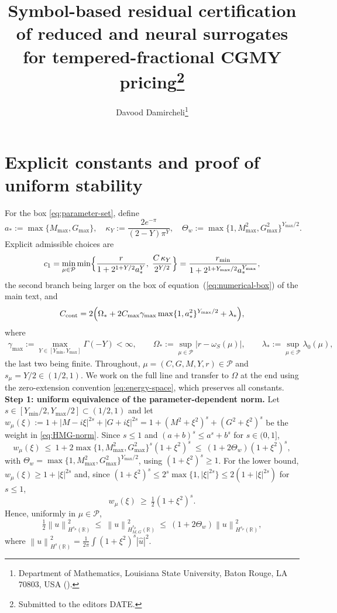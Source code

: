 \documentclass[supplement,hidelinks]{siamart251216}
\title{Symbol-based residual certification of reduced and neural surrogates for tempered-fractional CGMY pricing\thanks{Submitted to the editors DATE.}}
\author{Davood Damircheli\thanks{Department of Mathematics, Louisiana State University, Baton Rouge, LA 70803, USA
(\email{ddamircheli@lsu.edu}).}}
\newcommand{\R}{\mathbb{R}}
\newcommand{\Pset}{\mathcal{P}}
\newcommand{\norm}[1]{\left\lVert #1\right\rVert}
\newcommand{\rf}{r}
\begin{document}
\maketitle
\section{Explicit constants and proof of uniform stability}
\label{app:proof-uniform}\label{ssec:lk-coercivity}
For the box \eqref{eq:parameter-set}, define
\begin{equation}
  a_\ast:=\max\{M_{\max},G_{\max}\},\quad
  \kappa_Y:=\frac{2e^{-\pi}}{(2-Y)\pi^{Y}},\quad
  \Theta_w:=\max\{1,M_{\max}^2,G_{\max}^2\}^{Y_{\max}/2}.
  \label{eq:uniform-constants-aux}
\end{equation}
Explicit admissible choices are
\begin{equation}
  c_1
  =\min_{\mu\in\Pset}\min\Bigl\{
    \frac{\rf}{1+2^{1+Y/2}a_\ast^{Y}},\;
    \frac{C\,\kappa_Y}{2^{Y/2}}
  \Bigr\}
  =\frac{r_{\min}}{1+2^{1+Y_{\max}/2}a_\ast^{Y_{\max}}},
  \label{eq:c1-explicit}
\end{equation}
the second branch being larger on the box of equation~(\ref{eq:numerical-box}) of the main text, and
\begin{equation}
  C_{\rm cont}
  =2\Bigl(
    \Omega_\ast
    +2C_{\max}\gamma_{\max}\max\{1,a_\ast^2\}^{Y_{\max}/2}
    +\lambda_\ast
  \Bigr),
  \label{eq:Ccont-explicit}
\end{equation}
where
\begin{equation}
\begin{gathered}
\gamma_{\max}:=\!\!\max_{Y\in[Y_{\min},Y_{\max}]}\!\!\Gamma(-Y)<\infty,
\qquad
\Omega_\ast:=\sup_{\mu\in\Pset}|\rf-\omega_S(\mu)|,
\qquad
\lambda_\ast:=\sup_{\mu\in\Pset}\lambda_0(\mu),
\end{gathered}
\label{eq:uniform-aux-constants}
\end{equation}
the last two being finite.
Throughout, $\mu=(C,G,M,Y,\rf)\in\Pset$ and $s_\mu=Y/2\in(1/2,1)$.  We work on
the full line and transfer to $\Omega$ at the end using
the zero-extension convention
\eqref{eq:energy-space}, which preserves all constants.
\medskip\noindent
\textbf{Step 1: uniform equivalence of the parameter-dependent norm.}
Let $s\in[Y_{\min}/2,Y_{\max}/2]\subset(1/2,1)$ and let
$w_\mu(\xi):=1+|M-i\xi|^{2s}+|G+i\xi|^{2s}
=1+(M^2+\xi^2)^{s}+(G^2+\xi^2)^{s}$ be the weight in
\eqref{eq:HMG-norm}.  Since $s\le1$ and $(a+b)^s\le a^s+b^s$ for $s\in(0,1]$,
\[
  w_\mu(\xi)\ \le\ 1+2\max\{1,M_{\max}^2,G_{\max}^2\}^{s}(1+\xi^2)^{s}
  \ \le\ (1+2\Theta_w)(1+\xi^2)^{s},
\]
with $\Theta_w=\max\{1,M_{\max}^2,G_{\max}^2\}^{Y_{\max}/2}$, using
$(1+\xi^2)^s\ge1$.  For the lower bound, $w_\mu(\xi)\ge1+|\xi|^{2s}$ and,
since $(1+\xi^2)^s\le2^s\max\{1,|\xi|^{2s}\}\le2(1+|\xi|^{2s})$ for
$s\le1$,
\[
  w_\mu(\xi)\ \ge\ \tfrac12(1+\xi^2)^{s}.
\]
Hence, uniformly in $\mu\in\Pset$,
\begin{equation}
  \tfrac12\norm{u}_{H^{s_\mu}(\R)}^2
  \ \le\ \norm{u}_{H^{s_\mu}_{M,G}(\R)}^2
  \ \le\ (1+2\Theta_w)\norm{u}_{H^{s_\mu}(\R)}^2 ,
  \label{eq:uniform-norm-equivalence}
\end{equation}
where $\norm{u}_{H^{s}(\R)}^2=\tfrac1{2\pi}\int(1+\xi^2)^{s}|\widehat u|^2$.
\end{document}
